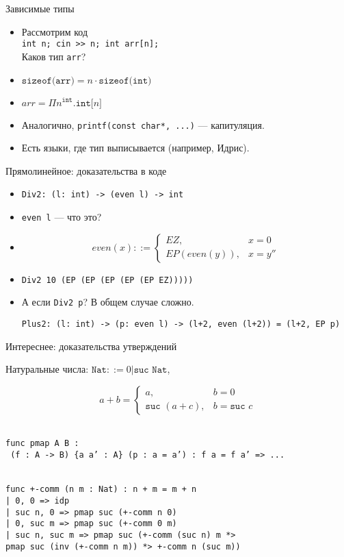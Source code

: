\documentclass[aspectratio=169]{beamer}
\begin{document}
\begin{frame}{Зависимые типы}
\begin{itemize}\item Рассмотрим код\\ \texttt{int n; cin >{}>{} n; int arr[n];} \\
Каков тип \texttt{arr}? \pause
\item $\texttt{sizeof(arr)} = n \cdot \texttt{sizeof(int)}$ \pause
\item $arr = \Pi n^{\texttt{int}}.\texttt{int[}n\texttt{]}$ \pause
\item Аналогично, \texttt{printf(const char*, ...)} --- капитуляция. \pause
\item Есть языки, где тип выписывается (например, Идрис).
\end{itemize}
\end{frame}

\begin{frame}{Прямолинейное: доказательства в коде}
\begin{itemize}
\item \texttt{Div2: (l: int) -> (even l) -> int}\pause
\item \texttt{even l} --- что это?\pause
\item $$even (x) ::= \left\{\begin{array}{ll} EZ, & x = 0\\ EP(even(y)), & x = y''\end{array}\right.$$\pause
\item \texttt{Div2 10 (EP (EP (EP (EP (EP EZ)))))}\pause
\item А если \texttt{Div2 p}? В общем случае сложно.

\texttt{Plus2: (l: int) -> (p: even l) -> (l+2, even (l+2)) = (l+2, EP p)}
\end{itemize}
\end{frame}

\begin{frame}{Интереснее: доказательства утверждений}

Натуральные числа: $\texttt{Nat} ::= 0 | \texttt{suc Nat}$,

$$a + b = \left\{\begin{array}{ll} a, & b = 0\\ \texttt{suc }(a + c), & b = \texttt{suc }c\end{array}\right.$$

\texttt{\\func pmap {A B : \\} (f : A -> B) \{a a' : A\} (p : a = a') : f a = f a' => ...}

\texttt{\\func +-comm (n m : Nat) : n + m = m + n\\
  | 0, 0 => idp\\
  | suc n, 0 => pmap suc (+-comm n 0)\\
  | 0, suc m => pmap suc (+-comm 0 m)\\
  | suc n, suc m => pmap suc (+-comm (suc n) m *> \\
                    pmap suc (inv (+-comm n m)) *> +-comm n (suc m))}

\end{frame}
\end{document}

